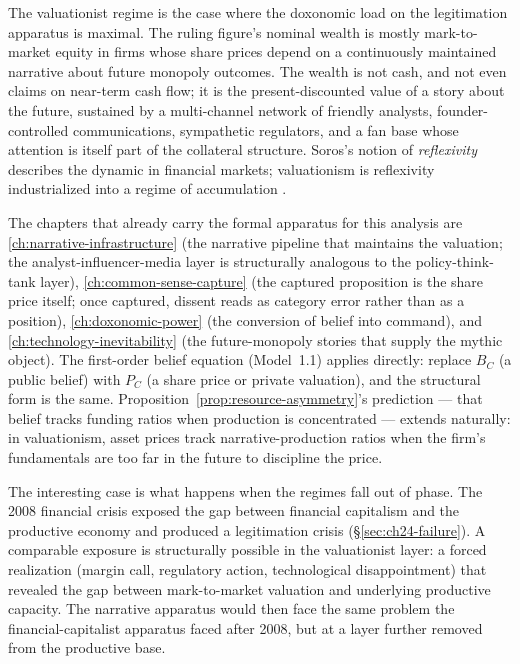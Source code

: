 The valuationist regime is the case where the doxonomic load on the legitimation apparatus is maximal. The ruling figure's nominal wealth is mostly mark-to-market equity in firms whose share prices depend on a continuously maintained narrative about future monopoly outcomes. The wealth is not cash, and not even claims on near-term cash flow; it is the present-discounted value of a story about the future, sustained by a multi-channel network of friendly analysts, founder-controlled communications, sympathetic regulators, and a fan base whose attention is itself part of the collateral structure. Soros's notion of \emph{reflexivity} \autocite{soros1987} describes the dynamic in financial markets; valuationism is reflexivity industrialized into a regime of accumulation \autocite{krippner2011, tooze2018}.

The chapters that already carry the formal apparatus for this analysis are \ref{ch:narrative-infrastructure} (the narrative pipeline that maintains the valuation; the analyst-influencer-media layer is structurally analogous to the policy-think-tank layer), \ref{ch:common-sense-capture} (the captured proposition is the share price itself; once captured, dissent reads as category error rather than as a position), \ref{ch:doxonomic-power} (the conversion of belief into command), and \ref{ch:technology-inevitability} (the future-monopoly stories that supply the mythic object).
The first-order belief equation (Model~1.1) applies directly: replace $B_C$ (a public belief) with $P_C$ (a share price or private valuation), and the structural form is the same.
Proposition~\ref{prop:resource-asymmetry}'s prediction --- that belief tracks funding ratios when production is concentrated --- extends naturally: in valuationism, asset prices track narrative-production ratios when the firm's fundamentals are too far in the future to discipline the price.

The interesting case is what happens when the regimes fall out of phase. The 2008 financial crisis exposed the gap between financial capitalism and the productive economy and produced a legitimation crisis (§\ref{sec:ch24-failure}). A comparable exposure is structurally possible in the valuationist layer: a forced realization (margin call, regulatory action, technological disappointment) that revealed the gap between mark-to-market valuation and underlying productive capacity. The narrative apparatus would then face the same problem the financial-capitalist apparatus faced after 2008, but at a layer further removed from the productive base.

